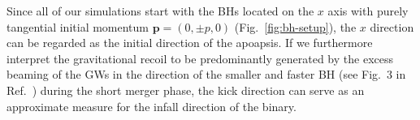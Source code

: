 \documentclass[floats,floatfix,showpacs,amssymb,prd,twocolumn,superscriptaddress,nofootinbib,nolongbibliography,reprint]{revtex4-2}
\newcommand{\mr}[1]{{\textcolor{cyan}{\sf{[MR: #1]}} }}
\begin{document}
%
Since all of our simulations start with the BHs located on the $x$
axis with purely tangential initial momentum $\mathbf{p}=(0,\pm p,0)$
(Fig.~\ref{fig:bh-setup}), the $x$ direction can be regarded as the
initial direction of the apoapsis. If we furthermore interpret the
gravitational recoil to be predominantly generated by the excess
beaming of the GWs in the direction of the smaller and faster BH (see
Fig.~3 in Ref.~\cite{Wiseman:1992dv}) during the short merger phase,
the kick direction can serve as an approximate measure for the infall
direction of the binary. 
%
%
%
\end{document}
